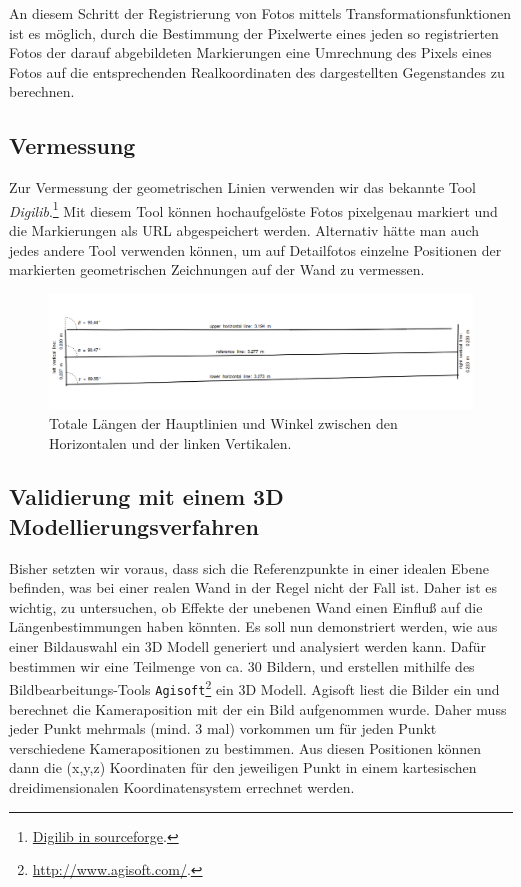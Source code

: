 \documentclass[twocolumn]{bmcart}
\begin{document}
An diesem Schritt der Registrierung von Fotos mittels Transformationsfunktionen ist es möglich, durch die Bestimmung der Pixelwerte eines jeden so registrierten Fotos der darauf abgebildeten Markierungen eine Umrechnung des Pixels eines Fotos auf die entsprechenden Realkoordinaten des dargestellten Gegenstandes zu berechnen.

\subsection{Vermessung}

Zur Vermessung der geometrischen Linien verwenden wir das bekannte Tool \textit{Digilib}.\footnote{\href{http://digilib.sourceforge.net/}{Digilib in sourceforge}.} Mit diesem Tool können hochaufgelöste Fotos pixelgenau markiert und die Markierungen als URL abgespeichert werden. Alternativ hätte man auch jedes andere Tool verwenden können, um auf Detailfotos einzelne Positionen der markierten geometrischen Zeichnungen auf der Wand zu vermessen. 

\begin{figure}
\centering
\includegraphics[width=1.2\linewidth]{figures/plot.png}
\caption{Totale Längen der Hauptlinien und Winkel zwischen den Horizontalen und der linken Vertikalen.}
\label{fig:plot}
\end{figure}

\subsection{Validierung mit einem 3D Modellierungsverfahren}

Bisher setzten wir voraus, dass sich die Referenzpunkte in einer idealen Ebene befinden, was bei einer realen Wand in der Regel nicht der Fall ist. Daher ist es wichtig, zu untersuchen, ob Effekte der unebenen Wand einen Einfluß auf die Längenbestimmungen haben könnten.
Es soll nun demonstriert werden, wie aus einer Bildauswahl ein 3D Modell generiert und analysiert werden kann. Dafür bestimmen wir eine Teilmenge von ca. 30 Bildern, und erstellen mithilfe des Bildbearbeitungs-Tools \texttt{Agisoft}\footnote{\href{http://www.agisoft.com/}{http://www.agisoft.com/}.} ein 3D Modell. Agisoft liest die Bilder ein und berechnet die Kameraposition mit der ein Bild aufgenommen wurde. Daher muss jeder Punkt mehrmals (mind. 3 mal) vorkommen um für jeden Punkt verschiedene Kamerapositionen zu bestimmen. 
Aus diesen Positionen können dann die (x,y,z) Koordinaten für den jeweiligen Punkt in einem kartesischen dreidimensionalen Koordinatensystem errechnet werden. 
\end{document}
